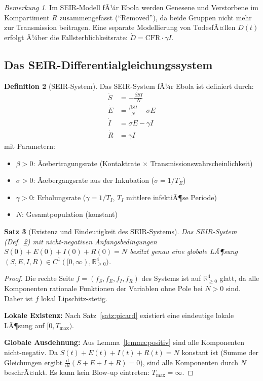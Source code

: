 ﻿\documentclass[12pt,a4paper]{article}
\theoremstyle{definition}
\newtheorem{definition}{Definition}[section]
\theoremstyle{plain}
\newtheorem{satz}[definition]{Satz}
\theoremstyle{remark}
\newtheorem{bemerkung}[definition]{Bemerkung}
\newcommand{\RRR}{\mathbb{R}}
\newcommand{\dd}{\mathrm{d}}
\begin{document}
\begin{bemerkung}
Im SEIR-Modell fÃ¼r Ebola werden Genesene und Verstorbene im Kompartiment $R$
zusammengefasst (``Removed''), da beide Gruppen nicht mehr zur Transmission beitragen.
Eine separate Modellierung von TodesfÃ¤llen $D(t)$ erfolgt Ã¼ber die Fallsterblichkeitsrate:
$\dot{D} = \text{CFR} \cdot \gamma I$.
\end{bemerkung}

\subsection{Das SEIR-Differentialgleichungssystem}

\begin{definition}[SEIR-System]
\label{def:seir}
Das SEIR-System fÃ¼r Ebola ist definiert durch:
\begin{align}
  \dot{S} &= -\frac{\beta S I}{N} \label{eq:S} \\
  \dot{E} &= \frac{\beta S I}{N} - \sigma E \label{eq:E} \\
  \dot{I} &= \sigma E - \gamma I \label{eq:I} \\
  \dot{R} &= \gamma I \label{eq:R}
\end{align}
mit Parametern:
\begin{itemize}
  \item $\beta > 0$: Ãœbertragungsrate (Kontaktrate $\times$ Transmissionswahrscheinlichkeit)
  \item $\sigma > 0$: Ãœbergangsrate aus der Inkubation ($\sigma = 1/T_E$)
  \item $\gamma > 0$: Erholungsrate ($\gamma = 1/T_I$, $T_I$ mittlere infektiÃ¶se Periode)
  \item $N$: Gesamtpopulation (konstant)
\end{itemize}
\end{definition}

\begin{satz}[Existenz und Eindeutigkeit des SEIR-Systems]
\label{satz:existenz}
Das SEIR-System (Def.~\ref{def:seir}) mit nicht-negativen Anfangsbedingungen
$S(0)+E(0)+I(0)+R(0) = N$
besitzt genau eine globale LÃ¶sung $(S,E,I,R) \in C^1([0,\infty), \RRR^4_{\geq 0})$.
\end{satz}

\begin{proof}
Die rechte Seite $f = (f_S, f_E, f_I, f_R)$ des Systems ist auf $\RRR^4_{\geq 0}$
glatt, da alle Komponenten rationale Funktionen der Variablen ohne Pole bei $N > 0$ sind.
Daher ist $f$ lokal Lipschitz-stetig.

\textbf{Lokale Existenz:} Nach Satz~\ref{satz:picard} existiert eine eindeutige
lokale LÃ¶sung auf $[0, T_{\max})$.

\textbf{Globale Ausdehnung:} Aus Lemma~\ref{lemma:positiv} sind alle
Komponenten nicht-negativ. Da $S(t) + E(t) + I(t) + R(t) = N$ konstant ist
(Summe der Gleichungen ergibt $\frac{\dd}{\dd t}(S+E+I+R) = 0$), sind alle
Komponenten durch $N$ beschrÃ¤nkt. Es kann kein Blow-up eintreten: $T_{\max} = \infty$.
\end{proof}
\end{document}
